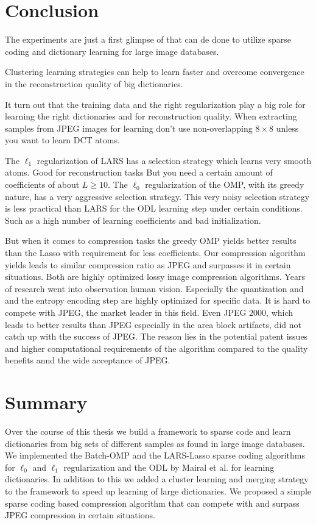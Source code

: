 \section{Conclusion}
The experiments are just a first glimpse of that can de done to utilize sparse
coding and dictionary learning for large image databases.

Clustering learning strategies can help to learn faster and overcome
convergence in the reconstruction quality of big dictionaries.


It turn out that the training data and the right 
regularization play a big role for learning the right dictionaries and
for reconstruction quality. When extracting samples from JPEG images for
learning don't use non-overlapping $8 \times 8$ unless you want to learn DCT
atoms. 

The $\ell_1$ regularization of LARS has a selection strategy
which learns very smooth atoms. Good for reconstruction tasks 
But you need a certain amount of coefficients of about $L \ge 10$.
The $\ell_0$ regularization of the OMP, with its greedy nature, has a very
aggressive selection strategy. 
This very noisy selection strategy is less practical
than LARS for the ODL learning step under certain conditions. Such as a high
number of learning coefficients and bad initialization.

But when it comes to compression tasks the greedy OMP yields better results
than the Lasso with requirement for less coefficients. 
Our compression algorithm yields leads to similar compression ratio as JPEG
and surpasses it in certain situations. Both are highly optimized lossy image
compression algorithms.  Years of research went into observation human vision. 
Especially the quantization and and the entropy encoding step are highly
optimized for specific data. It is hard to compete with JPEG, the market leader
in this field.  Even JPEG 2000, which leads to better results than JPEG
especially in the area block artifacts, did not catch up with the success of
JPEG.  The reason lies in the potential patent issues and higher computational
requirements of the algorithm compared to the quality benefits annd the wide
acceptance of JPEG.



\section{Summary}
Over the course of this thesis we build a framework to sparse code and learn
dictionaries from big sets of different samples as found in large image
databases. We implemented the Batch-OMP and the LARS-Lasso sparse coding
algorithms for $\ell_0$ and $\ell_1$ regularization and the ODL by Mairal et
al. for learning dictionaries. 
In addition to this we added a cluster learning and merging strategy to the
framework to speed up learning of large dictionaries.
We proposed a simple sparse coding based compression algorithm that can compete
with and surpass JPEG compression in certain situations.


